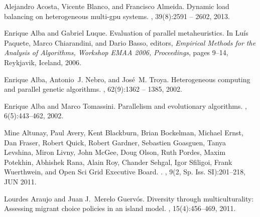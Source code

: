 \documentclass[final,1p,times]{elsarticle}
\begin{document}






%
%



\begin{thebibliography}{10}

Alejandro Acosta, Vicente Blanco, and Francisco Almeida.
\newblock Dynamic load balancing on heterogeneous multi-gpu systems.
, 39(8):2591 -- 2602, 2013.

Enrique Alba and Gabriel Luque.
\newblock Evaluation of parallel metaheuristics.
\newblock In Lu\'is Paquete, Marco Chiarandini, and Dario Basso, editors, {\em
  Empirical Methods for the Analysis of Algorithms, Workshop EMAA 2006,
  Proceedings}, pages 9--14, Reykjavik, Iceland, 2006.

Enrique Alba, Antonio~J. Nebro, and Jos\'e~M. Troya.
\newblock Heterogeneous computing and parallel genetic algorithms.
, 62(9):1362 --
  1385, 2002.

Enrique Alba and Marco Tomassini.
\newblock Parallelism and evolutionary algorithms.
, 6(5):443--462,
  2002.

Mine Altunay, Paul Avery, Kent Blackburn, Brian Bockelman, Michael Ernst, Dan
  Fraser, Robert Quick, Robert Gardner, Sebastien Goasguen, Tanya Levshina,
  Miron Livny, John McGee, Doug Olson, Ruth Pordes, Maxim Potekhin, Abhishek
  Rana, Alain Roy, Chander Sehgal, Igor Sfiligoi, Frank Wuerthwein, and {Open
  Sci Grid Executive Board}.
.
, {9}({2, Sp. Iss. SI}):{201--218},
  {JUN} 2011.

Lourdes Araujo and Juan J.~Merelo Guerv{\'o}s.
\newblock Diversity through multiculturality: Assessing migrant choice policies
  in an island model.
, 15(4):456--469, 2011.


\end{thebibliography}
\end{document}
